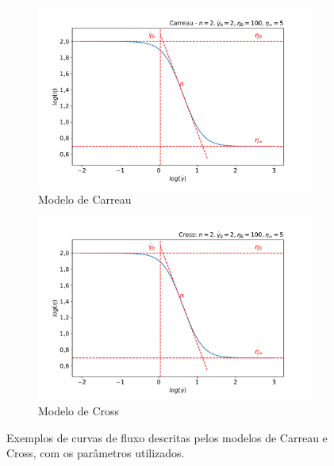 		\begin{figure}[h]
			\begin{subfigure}[t]{0.45\textwidth}
				\centering
				\includegraphics[width=\textwidth]{./imagens/reologia/Carreau}
				\caption{Modelo de Carreau}
				\label{fig:reologia_modelo_carreau}
			\end{subfigure} \qquad %
			\begin{subfigure}[t]{0.45\textwidth}
				\centering
				\includegraphics[width=\textwidth]{./imagens/reologia/Cross}
				\caption{Modelo de Cross}
				\label{fig:reologia_modelo_cross}
			\end{subfigure}
			\caption{Exemplos de curvas de fluxo descritas pelos modelos de Carreau e Cross, com os parâmetros utilizados.}
			\label{fig:reologia_modelos}
		\end{figure}
		
